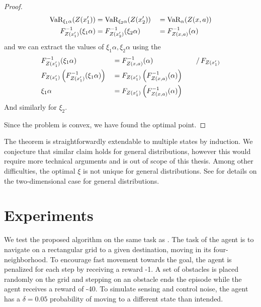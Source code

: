 \begin{proof}
\begin{equation*}
\begin{split}
\text{VaR}_{\xi_1\alpha}(Z(x_1')) &= \text{VaR}_{\xi_2\alpha}(Z(x_2')) &&= \text{VaR}_\alpha(Z(x, a))\\
F^{-1}_{Z(x_1')}(\xi_1\alpha) &= F^{-1}_{Z(x_2')}(\xi_2\alpha) &&= F^{-1}_{Z(x, a)}(\alpha)
\end{split}
\end{equation*}
and we can extract the values of $\xi_1\alpha, \xi_2\alpha$ using the 
\begin{equation*}
\begin{split}
&F^{-1}_{Z(x_1')}(\xi_1\alpha) &&= F^{-1}_{Z(x, a)}(\alpha) &&&/ \, F_{Z(x_1')}\\
&F_{Z(x_1')}\left( {F^{-1}_{Z(x_1')}(\xi_1\alpha)} \right) &&= F_{Z(x_1')}\left( {F^{-1}_{Z(x, a)}(\alpha)} \right)\\
&\xi_1\alpha &&= F_{Z(x_1')}\left( {F^{-1}_{Z(x, a)}(\alpha)} \right)
\end{split}
\end{equation*}
And similarly for $\xi_2$.

Since the problem is convex, we have found the optimal point.

\end{proof}

The theorem is straightforwardly extendable to multiple states by induction. We conjecture that similar claim holds for general distributions, however this would require more technical arguments and is out of scope of this thesis. Among other difficulties, the optimal $\xi$ is not unique for general distributions. See \citet{bernard2015quantile} for details on the two-dimensional case for general distributions.




\section{Experiments}\label{sec:vi:experiments}

We test the proposed algorithm on the same task as \citet{chow2015risk}. The task of the agent is to navigate on a rectangular grid to a given destination, moving in its four-neighborhood. To encourage fast movement towards the goal, the agent is penalized for each step by receiving a reward -1. A set of obstacles is placed randomly on the grid and stepping on an obstacle ends the episode while the agent receives a reward of -40.
To simulate sensing and control noise, the agent has a $\delta=0.05$ probability of moving to a different state than intended.

